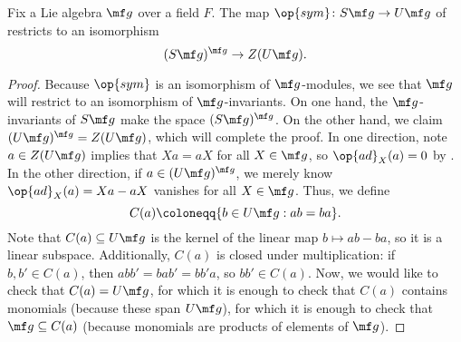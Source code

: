\documentclass[../notes.tex]{subfiles}
\begin{document}
\begin{corollary}
	Fix a Lie algebra $\mf g$ over a field $F$. The map $\op{sym}\colon S\mf g\to U\mf g$ of  restricts to an isomorphism
	\[(S\mf g)^{\mf g}\to Z(U\mf g).\]
\end{corollary}
\begin{proof}
	Because $\op{sym}$ is an isomorphism of $\mf g$-modules, we see that $\mf g$ will restrict to an isomorphism of $\mf g$-invariants. On one hand, the $\mf g$-invariants of $S\mf g$ make the space $(S\mf g)^{\mf g}$. On the other hand, we claim $(U\mf g)^{\mf g}=Z(U\mf g)$, which will complete the proof. In one direction, note $a\in Z(U\mf g)$ implies that $Xa=aX$ for all $X\in\mf g$, so $\op{ad}_X(a)=0$ by . In the other direction, if $a\in(U\mf g)^{\mf g}$, we merely know $\op{ad}_X(a)=Xa-aX$ vanishes for all $X\in\mf g$. Thus, we define
	\[C(a)\coloneqq\{b\in U\mf g:ab=ba\}.\]
	Note that $C(a)\subseteq U\mf g$ is the kernel of the linear map $b\mapsto ab-ba$, so it is a linear subspace. Additionally, $C(a)$ is closed under multiplication: if $b,b'\in C(a)$, then $abb'=bab'=bb'a$, so $bb'\in C(a)$. Now, we would like to check that $C(a)=U\mf g$, for which it is enough to check that $C(a)$ contains monomials (because these span $U\mf g$), for which it is enough to check that $\mf g\subseteq C(a)$ (because monomials are products of elements of $\mf g$).
\end{proof}
\end{document}
